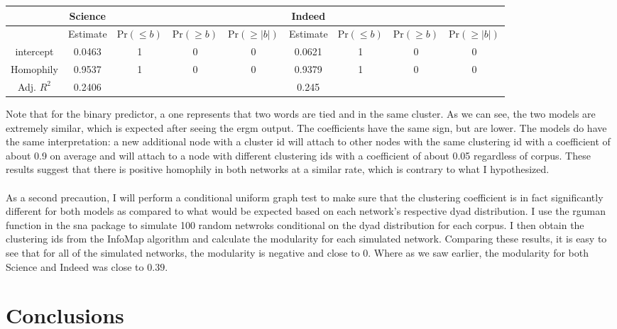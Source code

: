 \documentclass[12pt]{article}
\begin{document}
\vspace{2mm}
\begin{center}
	\begin{tabular}{ |c|c|c|c|c||c|c|c|c|  }
		\hline
		&Science&&&&Indeed&&& \\
		\hline
		&Estimate&Pr$(\le b)$ &Pr$(\ge b)$ &Pr$(\ge |b|)$&Estimate&Pr$(\le b)$ &Pr$(\ge b)$ &Pr$(\ge |b|)$ \\ 
		\hline 
		intercept&0.0463& 1&   0&  0&0.0621& 1&       0&       0      \\
		Homophily&0.9537 &1  &0   &0&0.9379 &1       &0       &0\\
		\hline
		Adj. $R^{2}$&0.2406&&&&0.245&&& \\
		\hline
	\end{tabular}
\end{center}
\vspace{2mm}
Note that for the binary predictor, a one represents that two words are tied and in the same cluster. As we can see, the two models are extremely similar, which is expected after seeing the ergm output. The coefficients have the same sign, but are lower. The models do have the same interpretation:  a new additional node with a cluster id will attach to other nodes with the same clustering id with a coefficient of about 0.9 on average and will attach to a node with different clustering ids with a coefficient of about 0.05 regardless of corpus. These results suggest that there is positive homophily in both networks at a similar rate, which is contrary to what I hypothesized.   
\\
\\
As a second precaution, I will perform a conditional uniform graph test to make sure that the clustering coefficient is in fact significantly different for both models as compared to what would be expected based on each network's respective dyad distribution. I use the rguman function in the sna package to simulate 100 random netwroks conditional on the dyad distribution for each corpus. I then obtain the clustering ids from the InfoMap algorithm and calculate the modularity for each simulated network. Comparing these results, it is easy to see that for all of the simulated networks, the modularity is negative and close to $0$. Where as we saw earlier, the modularity for both Science and Indeed was close to $0.39.$ 
 
\section{Conclusions}
\end{document}
